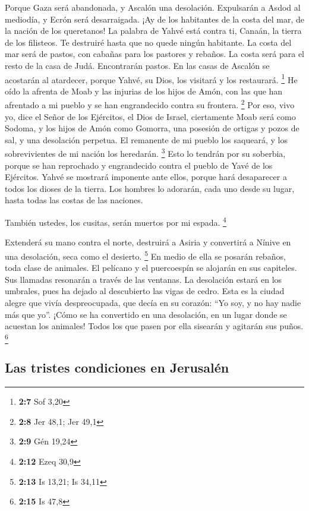  Porque Gaza será abandonada, y Ascalón una desolación.
Expulsarán a Asdod al mediodía, y Ecrón será desarraigada.
 ¡Ay de los habitantes de la costa del mar, de la nación
de los queretanos! La palabra de Yahvé está contra ti, Canaán, la tierra
de los filisteos. Te destruiré hasta que no quede ningún habitante.
 La costa del mar será de pastos, con cabañas para los
pastores y rebaños.  La costa será para el resto de la
casa de Judá. Encontrarán pastos. En las casas de Ascalón se acostarán
al atardecer, porque Yahvé, su Dios, los visitará y los restaurará.
\footnote{\textbf{2:7} Sof 3,20}  He oído la afrenta de
Moab y las injurias de los hijos de Amón, con las que han afrentado a mi
pueblo y se han engrandecido contra su frontera. \footnote{\textbf{2:8}
  Jer 48,1; Jer 49,1}  Por eso, vivo yo, dice el Señor de
los Ejércitos, el Dios de Israel, ciertamente Moab será como Sodoma, y
los hijos de Amón como Gomorra, una posesión de ortigas y pozos de sal,
y una desolación perpetua. El remanente de mi pueblo los saqueará, y los
sobrevivientes de mi nación los heredarán. \footnote{\textbf{2:9} Gén
  19,24}  Esto lo tendrán por su soberbia, porque se han
reprochado y engrandecido contra el pueblo de Yavé de los Ejércitos.
 Yahvé se mostrará imponente ante ellos, porque hará
desaparecer a todos los dioses de la tierra. Los hombres lo adorarán,
cada uno desde su lugar, hasta todas las costas de las naciones.

 También ustedes, los cusitas, serán muertos por mi
espada. \footnote{\textbf{2:12} Ezeq 30,9}

 Extenderá su mano contra el norte, destruirá a Asiria y
convertirá a Nínive en una desolación, seca como el desierto.
\footnote{\textbf{2:13} Is 13,21; Is 34,11}  En medio de
ella se posarán rebaños, toda clase de animales. El pelícano y el
puercoespín se alojarán en sus capiteles. Sus llamadas resonarán a
través de las ventanas. La desolación estará en los umbrales, pues ha
dejado al descubierto las vigas de cedro.  Esta es la
ciudad alegre que vivía despreocupada, que decía en su corazón: ``Yo
soy, y no hay nadie más que yo''. ¡Cómo se ha convertido en una
desolación, en un lugar donde se acuestan los animales! Todos los que
pasen por ella sisearán y agitarán sus puños. \footnote{\textbf{2:15} Is
  47,8}

\hypertarget{las-tristes-condiciones-en-jerusaluxe9n}{%
\subsection{Las tristes condiciones en
Jerusalén}\label{las-tristes-condiciones-en-jerusaluxe9n}}

